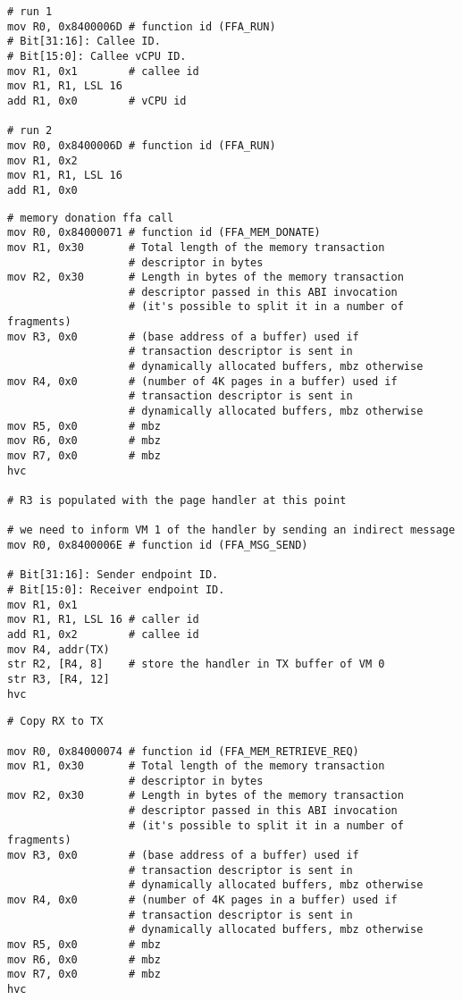 \documentclass{article}
\begin{document}
\begin{lstlisting}[caption={VM 0}]
# run 1
mov R0, 0x8400006D # function id (FFA_RUN)
# Bit[31:16]: Callee ID.
# Bit[15:0]: Callee vCPU ID.
mov R1, 0x1        # callee id
mov R1, R1, LSL 16
add R1, 0x0        # vCPU id

# run 2
mov R0, 0x8400006D # function id (FFA_RUN)
mov R1, 0x2
mov R1, R1, LSL 16
add R1, 0x0
\end{lstlisting}

\begin{lstlisting}[caption={VM 1}]
# memory donation ffa call
mov R0, 0x84000071 # function id (FFA_MEM_DONATE)
mov R1, 0x30       # Total length of the memory transaction 
                   # descriptor in bytes
mov R2, 0x30       # Length in bytes of the memory transaction 
                   # descriptor passed in this ABI invocation
                   # (it's possible to split it in a number of fragments)
mov R3, 0x0        # (base address of a buffer) used if 
                   # transaction descriptor is sent in 
                   # dynamically allocated buffers, mbz otherwise
mov R4, 0x0        # (number of 4K pages in a buffer) used if 
                   # transaction descriptor is sent in 
                   # dynamically allocated buffers, mbz otherwise
mov R5, 0x0        # mbz
mov R6, 0x0        # mbz
mov R7, 0x0        # mbz
hvc

# R3 is populated with the page handler at this point

# we need to inform VM 1 of the handler by sending an indirect message
mov R0, 0x8400006E # function id (FFA_MSG_SEND)

# Bit[31:16]: Sender endpoint ID.
# Bit[15:0]: Receiver endpoint ID.
mov R1, 0x1
mov R1, R1, LSL 16 # caller id
add R1, 0x2        # callee id
mov R4, addr(TX)
str R2, [R4, 8]    # store the handler in TX buffer of VM 0
str R3, [R4, 12]
hvc
\end{lstlisting}

\begin{lstlisting}[caption={VM 2}]
# Copy RX to TX

mov R0, 0x84000074 # function id (FFA_MEM_RETRIEVE_REQ)
mov R1, 0x30       # Total length of the memory transaction 
                   # descriptor in bytes
mov R2, 0x30       # Length in bytes of the memory transaction 
                   # descriptor passed in this ABI invocation
                   # (it's possible to split it in a number of fragments)
mov R3, 0x0        # (base address of a buffer) used if 
                   # transaction descriptor is sent in 
                   # dynamically allocated buffers, mbz otherwise
mov R4, 0x0        # (number of 4K pages in a buffer) used if 
                   # transaction descriptor is sent in 
                   # dynamically allocated buffers, mbz otherwise
mov R5, 0x0        # mbz
mov R6, 0x0        # mbz
mov R7, 0x0        # mbz
hvc
\end{lstlisting}
\end{document}
